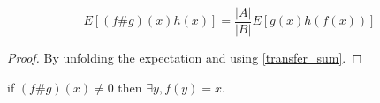 \begin{lemma}
    \label{transfer_expect}
    \leanok
    $$E[(f \# g) (x) h(x)] = \frac{|A|}{|B|} E[g(x) h(f(x))]$$
\end{lemma}

\begin{proof}
    \leanok
    By unfolding the expectation and using \ref{transfer_sum}.
\end{proof}


\begin{proposition}
    \label{transfer_ne_zero}
    \leanok
    if $(f \# g) (x) \neq 0$ then $\exists y, f(y) = x$.
\end{proposition}